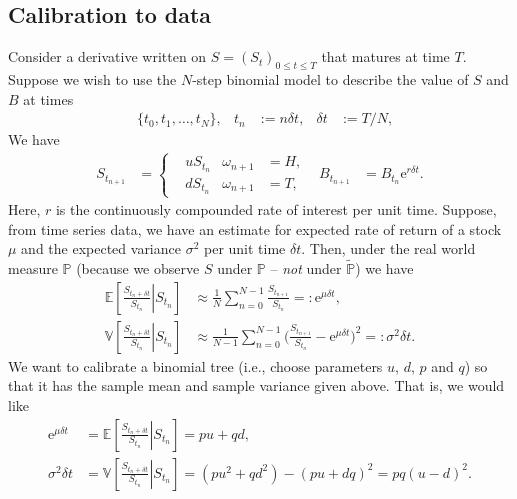 \documentclass[12pt]{book}
\numberwithin{equation}{chapter}
\theoremstyle{plain}
\numberwithin{theorem}{section}
\theoremstyle{definition}
\numberwithin{exercise}{chapter}
\newcommand{\<}{\langle}
\renewcommand{\>}{\rangle}
\renewcommand{\(}{\left(}
\renewcommand{\)}{\right)}
\renewcommand{\[}{\left[}
\renewcommand{\]}{\right]}
\newcommand\Eb{\mathds{E}}
\newcommand\Pb{\mathds{P}}
\newcommand\Vb{\mathds{V}}
\newcommand\om{\omega}
\newcommand\sig{\sigma}
\newcommand\del{\delta}
\newcommand\Pbt{\widetilde{\Pb}}
\newcommand\ee{\mathrm{e}}
\theoremstyle{definition}
\numberwithin{question}{section}
\begin{document}
\subsection{Calibration to data}
Consider a derivative written on $S = (S_t)_{0 \leq t \leq T}$ that matures at time $T$.
Suppose we wish to use the $N$-step binomial model to describe the value of $S$ and $B$ at times
\begin{align}
	&\{ t_0, t_1, \ldots , t_N \} , &
t_n
	&:=	n \del t , &
\del t
	&:=	T/N ,
\end{align}
We have
\begin{align}
S_{t_{n+1}}
	&=	\left\{ \begin{aligned}
			& u S_{t_n} & \om_{n+1} &= H , \\
			& d S_{t_n} & \om_{n+1} &= T ,
			\end{aligned} \right.  &
B_{t_{n+1}}
	&=	B_{t_n} \ee^{r \del t} .
\end{align}
Here, $r$ is the continuously compounded rate of interest per unit time.
Suppose, from time series data, we have an estimate for expected rate of return of a stock $\mu$ and the expected variance $\sig^2$ per unit time $\del t$.  Then, under the real world measure $\Pb$ (because we observe $S$ under $\Pb$ -- \textit{not} under $\Pbt$) we have
\begin{align}
\Eb \[ \left. \frac{S_{t_n + \delta t}}{S_{t_n}} \right| S_{t_n}\] 
	&\approx \frac{1}{N} \sum_{n=0}^{N-1} \frac{S_{t_{n+1}}}{S_{t_n}}
	=:	\ee^{\mu \delta t} , \\
\Vb \[ \left. \frac{S_{t_n + \delta t}}{S_{t_n}} \right| S_{t_n} \] 
	&\approx \frac{1}{N-1} \sum_{n=0}^{N-1} \Big( \frac{S_{t_{n+1}}}{S_{t_n}} - \ee^{\mu \del t} \Big)^2
	=:	\sigma^2 \delta t.
\end{align}
We  want to calibrate a binomial tree (i.e., choose parameters $u$, $d$, $p$ and $q$) so that it has the sample mean and sample variance given above.  That is, we would like
\begin{align}
\ee^{\mu \delta t}
	&=	\Eb \[ \left. \frac{S_{{t_n} + \delta t}}{S_{t_n}} \right| S_{t_n}\] 
	 = 	p u + q d , \label{eq:mean-match} \\
\sigma^2 \del t
	&=	\Vb \[ \left. \frac{S_{{t_n} + \delta t}}{S_{t_n}} \right| S_{t_n} \] 
	 = (p u^2 + q d^2) - (p u + d q)^2 
	=	p q ( u - d )^2 . \label{eq:xi}
\end{align}
\end{document}
